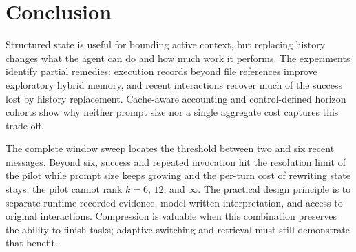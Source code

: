\section{Conclusion}
\label{sec:conclusion}
Structured state is useful for bounding active context, but replacing
history changes what the agent can do and how much work it performs.
The experiments identify partial remedies: execution records beyond file
references improve exploratory hybrid memory, and recent interactions
recover much of the success lost by history replacement. Cache-aware
accounting and control-defined horizon cohorts show why neither prompt
size nor a single aggregate cost captures this trade-off.

The complete window sweep locates the threshold between two and six
recent messages. Beyond six, success and repeated invocation hit the
resolution limit of the pilot while prompt size keeps growing and the
per-turn cost of rewriting state stays; the pilot cannot rank $k=6$,
$12$, and $\infty$.
The practical design principle is to separate runtime-recorded evidence,
model-written interpretation, and access to original interactions.
Compression is valuable when this combination preserves the ability to
finish tasks; adaptive switching and retrieval must still demonstrate
that benefit.
